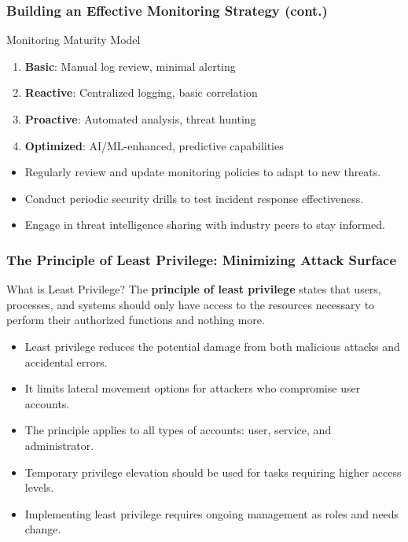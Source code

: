 \documentclass{beamer}
\begin{document}
    \begin{frame}
    \frametitle{Building an Effective Monitoring Strategy (cont.)}
        \begin{alertblock}{Monitoring Maturity Model}
            \begin{enumerate}
            \item \textbf{Basic}: Manual log review, minimal alerting
            \item \textbf{Reactive}: Centralized logging, basic correlation
            \item \textbf{Proactive}: Automated analysis, threat hunting
            \item \textbf{Optimized}: AI/ML-enhanced, predictive capabilities
            \end{enumerate}
            \end{alertblock}

    \begin{itemize}
        \item Regularly review and update monitoring policies to adapt to new threats.
        \item Conduct periodic security drills to test incident response effectiveness.
        \item Engage in threat intelligence sharing with industry peers to stay informed.
    \end{itemize}

    \end{frame}
    
    \begin{frame}
    \frametitle{The Principle of Least Privilege: Minimizing Attack Surface}
    
    \begin{block}{What is Least Privilege?}
    The \textbf{principle of least privilege} states that users, processes, and systems should only have access to the resources necessary to perform their authorized functions and nothing more.
    \end{block}
    
    \begin{itemize}
    \item Least privilege reduces the potential damage from both malicious attacks and accidental errors.
    \item It limits lateral movement options for attackers who compromise user accounts.
    \item The principle applies to all types of accounts: user, service, and administrator.
    \item Temporary privilege elevation should be used for tasks requiring higher access levels.
    \item Implementing least privilege requires ongoing management as roles and needs change.
    \end{itemize}

    \end{frame}
    
\end{document}

